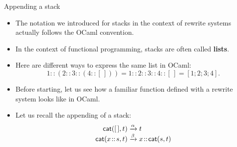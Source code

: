 \documentclass[compress,dvipdfmx]{beamer}
\newcommand{\OCaml}{\textsf{OCaml}\xspace}
\newcommand\fun[1]{\textsf{#1}}
\newcommand\el{[\,]}
\newcommand\cons[2]{{#1}\!::\!{#2}}
\begin{document}
%
\begin{frame}{Appending a stack}

  \begin{itemize}

    \item The notation we introduced for stacks in the context of
      rewrite systems actually follows the \OCaml convention.

    \item In the context of functional programming, stacks are often
      called \textbf{lists}.

    \item Here are different ways to express the same list in \OCaml:
      \begin{equation*}
        1::(2::3::(4::\el)) = 1::2::3::4::\el = [1;2;3;4].
      \end{equation*}

    \item Before starting, let us see how a familiar function defined
      with a rewrite system looks like in \OCaml.

    \item Let us recall the appending of a stack:
      \begin{align*}
        \fun{cat}(        \el,t) &\xrightarrow{\alpha} t\\
        \fun{cat}(\cons{x}{s},t) &\xrightarrow{\smash\beta}
        \cons{x}{\fun{cat}(s,t)}
      \end{align*}

  \end{itemize}
\end{frame}
\end{document}
